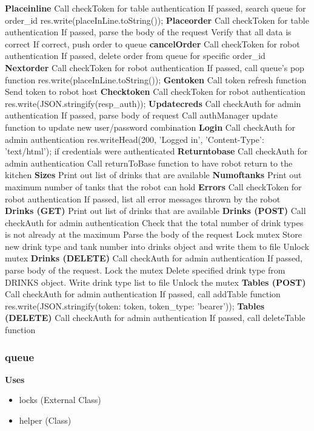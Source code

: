 \documentclass [10pt]{article}
\begin{document}
\textbf{Placeinline}
Call checkToken for table authentication
If passed, search queue for order\_id
res.write(placeInLine.toString());
\textbf{Placeorder}
Call checkToken for table authentication
If passed, parse the body of the request
Verify that all data is correct
If correct, push order to queue
\textbf{cancelOrder}
Call checkToken for robot authentication
If passed, delete order from queue for specific order\_id
\textbf{Nextorder}
Call checkToken for robot authentication
If passed, call queue’s pop function
res.write(placeInLine.toString());
\textbf{Gentoken}
Call token refresh function
Send token to robot host
\textbf{Checktoken}
Call checkToken for robot authentication
res.write(JSON.stringify(resp\_auth));
\textbf{Updatecreds}
Call checkAuth for admin authentication
If passed, parse body of request
Call authManager update function to update new user/password combination
\textbf{Login}
Call checkAuth for admin authentication
res.writeHead(200, 'Logged in', {'Content-Type': 'text/html'}); if credentials were authenticated
\textbf{Returntobase}
Call checkAuth for admin authentication
Call returnToBase function to have robot return to the kitchen
\textbf{Sizes}
Print out list of drinks that are available
\textbf{Numoftanks}
Print out maximum number of tanks that the robot can hold
\textbf{Errors}
Call checkToken for robot authentication
If passed, list all error messages thrown by the robot
\textbf{Drinks (GET)}
Print out list of drinks that are available
\textbf{Drinks (POST)}
Call checkAuth for admin authentication
Check that the total number of drink types is not already at the maximum
Parse the body of the request
Lock mutex
Store new drink type and tank number into drinks object and write them to file
Unlock mutex
\textbf{Drinks (DELETE)}
Call checkAuth for admin authentication
If passed, parse body of the request. Lock the mutex
Delete specified drink type from DRINKS object. Write drink type list to file
Unlock the mutex
\textbf{Tables (POST)}
Call checkAuth for admin authentication
If passed, call addTable function
res.write(JSON.stringify({token: token, token\_type: 'bearer'}));
\textbf{Tables (DELETE)}
Call checkAuth for admin authentication
If passed, call deleteTable function


\subsubsection{queue}
\textbf{Uses}
\begin{itemize}
	\item locks (External Class)
	\item helper (Class)
\end{itemize}
\end{document}
